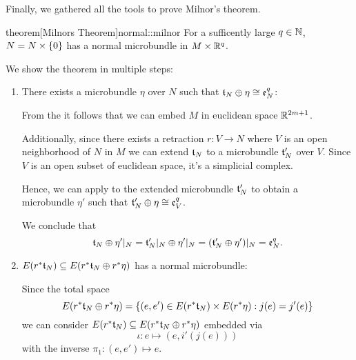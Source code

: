 \begin{scope}
    \newcommand{\rwhitney} {
        \whitney{\ind{r}\bt_N}{\ind{r}\eta}
    }
    \newcommand{\rtn} {
        \ind{r}\bt_N
    }

    \begin{myparagraph}
        Finally, we gathered all the tools to prove Milnor's theorem.
    \end{myparagraph}

    \begin{mystatement}{theorem}[Milnors Theorem]{normal::milnor}
        For a sufficently large $q \in \N$, $N = \cyldown{N}$ has a normal microbundle in $M \cross \R^q$.
    \end{mystatement}

    \begin{myproof}
        We show the theorem in multiple steps:
        \begin{enumerate}
            \item There exists a microbundle $\eta$ over $N$ such that $\whitney{\bt_N}{\eta} \cong \be[q]{N}$:
            
            From the  it follows that
            we can embed $M$ in euclidean space $\R^{2m + 1}$.

            Additionally, since there exists a retraction $r: V \to N$
            where $V$ is an open neighborhood of $N$ in $M$ we can extend $\bt_N$
            to a microbundle $\bt_N'$ over $V$.
            Since $V$ is an open subset of euclidean space, it's a simplicial complex.

            Hence, we can apply  to the extended microbundle $\bt_N'$
            to obtain a microbundle $\eta'$ such that $\whitney{\bt_N'}{\eta} \cong \be[q]{V}$.

            We conclude that
            \[
                \whitney{\bt_N}{\eta'\restr{N}}
                = \whitney{\bt_N'\restr{N}}{\eta'\restr{N}}
                = (\whitney{\bt_N'}{\eta'})\restr{N} = \be[q]{N}.
            \]

            \item $E(\rtn) \sub E(\rwhitney)$ has a normal microbundle:

            Since the total space
            \[ E(\rwhitney) = \set{(e, e') \in E(\rtn) \cross E(\ind{r}\eta)}{j(e) = j'(e)} \]
            we can consider $E(\rtn) \sub E(\rwhitney)$ embedded via
            \[ \iota: e \mapsto (e, i'(j(e))) \]
            with the inverse $\pi_1: (e, e') \mapsto e$.


\end{enumerate}
\end{myproof}
\end{scope}
